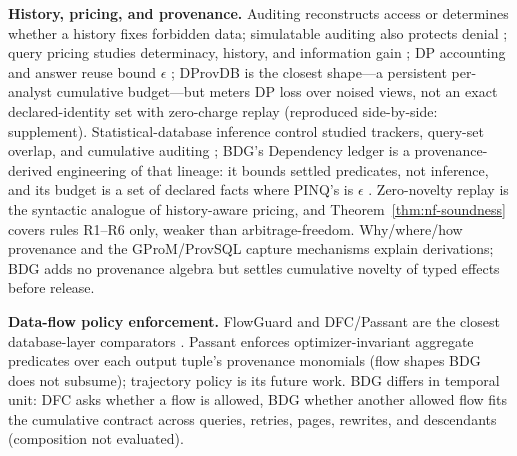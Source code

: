\documentclass[10pt,journal,compsoc]{IEEEtran}
\begin{document}
\textbf{History, pricing, and provenance.} Auditing reconstructs access or
determines whether a history fixes forbidden data; simulatable auditing
also protects denial
\cite{agrawal2004hippocratic,motwani2008auditing,kenthapadi2005simulatable};
query pricing studies determinacy, history, and information gain
\cite{koutris2012query,deep2017qirana,peng2025aria}; DP accounting and answer
reuse bound $\epsilon$ \cite{dwork2014foundations,mazmudar2022cachedp};
DProvDB \cite{zhang2023dprovdb} is the closest shape---a persistent
per-analyst cumulative budget---but meters DP loss over noised views, not
an exact declared-identity set with zero-charge replay (reproduced
side-by-side: supplement).
Statistical-database inference control studied trackers, query-set overlap,
and cumulative auditing
\cite{dobkin1979secure,denning1980tracker,adam1989security,kleinberg2003auditing,nabar2006robustness};
BDG's Dependency ledger is a provenance-derived engineering of that
lineage: it bounds settled predicates, not inference, and its budget is a
set of declared facts where PINQ's is $\epsilon$ \cite{mcsherry2009pinq}. Zero-novelty replay is the
syntactic analogue of history-aware pricing, and
Theorem~\ref{thm:nf-soundness} covers rules R1--R6 only, weaker than
arbitrage-freedom. Why/where/how provenance
\cite{buneman2001why,green2007provenance,cheney2009provenance,amsterdamer2011aggregate}
and the GProM/ProvSQL capture mechanisms
\cite{arab2018gprom,senellart2018provsql,sen2026provsql} explain derivations;
BDG adds no provenance algebra but settles cumulative novelty of typed
effects before release.

\textbf{Data-flow policy enforcement.} FlowGuard and DFC/Passant are the
closest database-layer comparators \cite{summers2026dataflow,summers2026passant}.
Passant enforces optimizer-invariant aggregate predicates over each output
tuple's provenance monomials (flow shapes BDG does not subsume);
trajectory policy is its future work. BDG differs in temporal unit: DFC asks whether a flow is
allowed, BDG whether another allowed flow fits the cumulative contract
across queries, retries, pages, rewrites, and descendants (composition not
evaluated).
\end{document}
